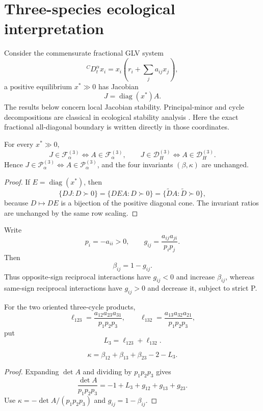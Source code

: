 \section{Three-species ecological interpretation}
\label{sec:ecology}

Consider the commensurate fractional GLV system
\[
{}^C D_t^\alpha x_i
=
x_i\left(r_i+\sum_j a_{ij}x_j\right),
\]
a positive equilibrium \(x^*\gg0\) has Jacobian
\[
J=\operatorname{diag}(x^*)A.
\]
The results below concern local Jacobian stability. Principal-minor and cycle decompositions are classical in ecological stability analysis \cite{ClarkHallam1982,Kinkhabwala2015}. Here the exact fractional all-diagonal boundary is written directly in those coordinates.

\begin{proposition}
\label{prop:GLV-invariance}
For every \(x^*\gg0\),
\[
J\in\mathcal F_\alpha^{(3)}
\iff
A\in\mathcal F_\alpha^{(3)},
\qquad
J\in\mathcal D_H^{(3)}
\iff
A\in\mathcal D_H^{(3)}.
\]
Hence \(J\in\mathcal P_\alpha^{(3)}\iff A\in\mathcal P_\alpha^{(3)}\), and the four invariants \((\beta,\kappa)\) are unchanged.
\end{proposition}

\begin{proof}
If \(E=\operatorname{diag}(x^*)\), then
\[
\{DJ:D\succ0\}
=
\{DEA:D\succ0\}
=
\{\widetilde D A:\widetilde D\succ0\},
\]
because \(D\mapsto DE\) is a bijection of the positive diagonal cone. The invariant ratios are unchanged by the same row scaling.
\end{proof}

Write
\[
p_i=-a_{ii}>0,
\qquad
g_{ij}=\frac{a_{ij}a_{ji}}{p_ip_j}.
\]
Then
\[
\boxed{\beta_{ij}=1-g_{ij}.}
\]
Thus opposite-sign reciprocal interactions have \(g_{ij}<0\) and increase \(\beta_{ij}\), whereas same-sign reciprocal interactions have \(g_{ij}>0\) and decrease it, subject to strict P.

For the two oriented three-cycle products,
\[
\ell_{123}
=
\frac{a_{12}a_{23}a_{31}}{p_1p_2p_3},
\qquad
\ell_{132}
=
\frac{a_{13}a_{32}a_{21}}{p_1p_2p_3},
\]
put
\[
L_3=\ell_{123}+\ell_{132}.
\]

\begin{proposition}
\label{prop:loop-identity}
\[
\boxed{
\kappa
=
\beta_{12}+\beta_{13}+\beta_{23}-2-L_3.
}
\]
\end{proposition}

\begin{proof}
Expanding \(\det A\) and dividing by \(p_1p_2p_3\) gives
\[
\frac{\det A}{p_1p_2p_3}
=
-1+L_3+g_{12}+g_{13}+g_{23}.
\]
Use \(\kappa=-\det A/(p_1p_2p_3)\) and \(g_{ij}=1-\beta_{ij}\).
\end{proof}

